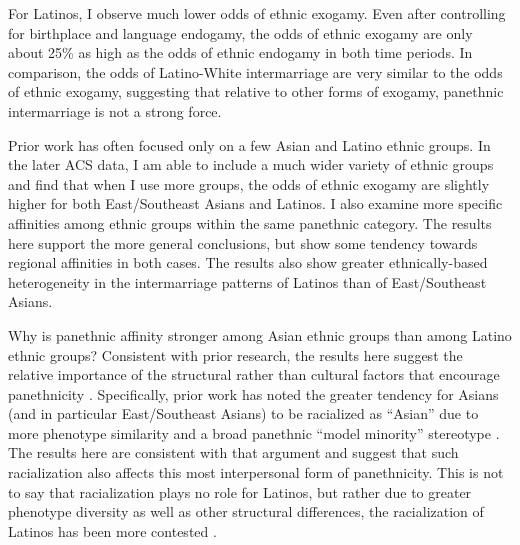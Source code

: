 \documentclass[11pt,]{article}
\begin{document}
For Latinos, I observe much lower odds of ethnic exogamy. Even after controlling for birthplace and language endogamy, the odds of ethnic exogamy are only about 25\% as high as the odds of ethnic endogamy in both time periods. In comparison, the odds of Latino-White intermarriage are very similar to the odds of ethnic exogamy, suggesting that relative to other forms of exogamy, panethnic intermarriage is not a strong force.

Prior work has often focused only on a few Asian and Latino ethnic groups. In the later ACS data, I am able to include a much wider variety of ethnic groups and find that when I use more groups, the odds of ethnic exogamy are slightly higher for both East/Southeast Asians and Latinos. I also examine more specific affinities among ethnic groups within the same panethnic category. The results here support the more general conclusions, but show some tendency towards regional affinities in both cases. The results also show greater ethnically-based heterogeneity in the intermarriage patterns of Latinos than of East/Southeast Asians.

Why is panethnic affinity stronger among Asian ethnic groups than among Latino ethnic groups? Consistent with prior research, the results here suggest the relative importance of the structural rather than cultural factors that encourage panethnicity \citep{lopez_panethnicity_1990}. Specifically, prior work has noted the greater tendency for Asians (and in particular East/Southeast Asians) to be racialized as ``Asian'' due to more phenotype similarity and a broad panethnic ``model minority'' stereotype \citep{lopez_panethnicity_1990, kibria_construction_1997, rosenfeld_salience_2001}. The results here are consistent with that argument and suggest that such racialization also affects this most interpersonal form of panethnicity. This is not to say that racialization plays no role for Latinos, but rather due to greater phenotype diversity as well as other structural differences, the racialization of Latinos has been more contested \citep{rodriguez_changing_2000a, frank_latino_2010a}.
\end{document}
